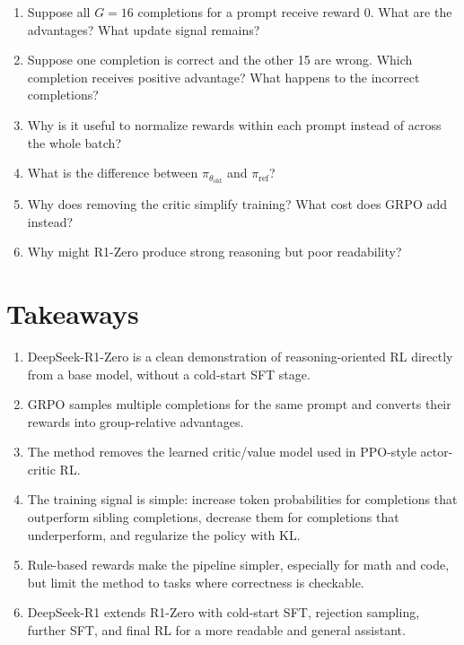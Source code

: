 \documentclass[11pt]{article}
\newcommand{\old}{\mathrm{old}}
\newcommand{\refm}{\mathrm{ref}}
\begin{document}
\begin{enumerate}[leftmargin=*]
  \item Suppose all $G=16$ completions for a prompt receive reward 0. What are the advantages? What update signal remains?
  \item Suppose one completion is correct and the other 15 are wrong. Which completion receives positive advantage? What happens to the incorrect completions?
  \item Why is it useful to normalize rewards within each prompt instead of across the whole batch?
  \item What is the difference between $\pi_{\theta_{\old}}$ and $\pi_{\refm}$?
  \item Why does removing the critic simplify training? What cost does GRPO add instead?
  \item Why might R1-Zero produce strong reasoning but poor readability?
\end{enumerate}

\section{Takeaways}

\begin{enumerate}[leftmargin=*]
  \item DeepSeek-R1-Zero is a clean demonstration of reasoning-oriented RL directly from a base model, without a cold-start SFT stage.
  \item GRPO samples multiple completions for the same prompt and converts their rewards into group-relative advantages.
  \item The method removes the learned critic/value model used in PPO-style actor-critic RL.
  \item The training signal is simple: increase token probabilities for completions that outperform sibling completions, decrease them for completions that underperform, and regularize the policy with KL.
  \item Rule-based rewards make the pipeline simpler, especially for math and code, but limit the method to tasks where correctness is checkable.
  \item DeepSeek-R1 extends R1-Zero with cold-start SFT, rejection sampling, further SFT, and final RL for a more readable and general assistant.
\end{enumerate}
\end{document}
